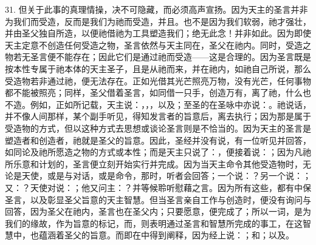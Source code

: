 31. 但关于此事的真理情操，决不可隐藏，而必须高声宣扬。因为天主的圣言并非为我们而受造，反而是我们为祂而受造，并且。也不是因为我们软弱，祂才强壮，并由圣父独自所造，以便祂借祂为工具塑造我们；绝无此念！并非如此。因为即使天主定意不创造任何受造之物，圣言依然与天主同在，圣父在祂内。同时，受造之物若无圣言便不能存在；因此它们是通过祂而受造——这是合理的。因为圣言既是按本性专属于祂本体的天主圣子，且是从祂而来，并在祂内，如祂自己所说，那么受造物若非通过祂，便无法存在。正如光借其光芒照亮万物，没有光芒，任何事物都不能被照亮；同样，圣父借着圣言，如同借一只手，创造万有，离了祂，什么也不造。例如，正如所记载，天主说：，，，以及；至圣的在圣咏中亦说：。祂说话，并不像人间那样，某个副手听见，得知发言者的旨意后，离去执行；因为那是属于受造物的方式，但以这种方式去思想或谈论圣言则是不恰当的。因为天主的圣言是塑造者和创造者，祂就是圣父的旨意。因此，圣经并没有说，有一位听见并回答，如同论及祂所愿造之物的方式或本性；而是天主只说了：，便接着说：；因为凡祂所乐意和计划的，圣言便立刻开始实行并完成。因为当天主命令其他受造物时，无论是天使，或是与对话，或是命令，那时，听者会回答；一个说：？另一个说：；又：？天使对说：；他又问主：？并等候聆听慰藉之言。因为所有这些，都有中保圣言，以及彰显圣父旨意的天主智慧。但当圣言亲自工作与创造时，便没有询问与回答，因为圣父在祂内，圣言也在圣父内；只要愿意，便完成了；所以一词，是为我们的缘故，作为旨意的标记，而，则表明通过圣言和智慧所完成的事工，在这智慧中，也蕴涵着圣父的旨意。而即在中得到阐释，因为经上说：；和；以及。\par

